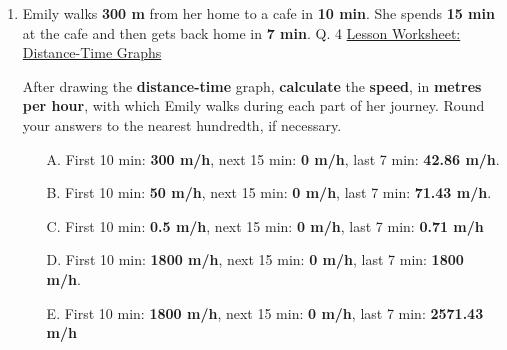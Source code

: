 \documentclass[A4,12pt]{article}
\begin{document}
\begin{enumerate}[label=\bfseries (\arabic*)]











\item Emily walks \textbf{300 m} from her home to a cafe in \textbf{10 min}. She spends \textbf{15 min} at the cafe and then gets back home in \textbf{7 min}. \cite{Nagwa} Q. 4 \href{https://www.nagwa.com/en/worksheets/932192593730/}{Lesson Worksheet: Distance-Time Graphs}

After drawing the \textbf{distance-time} graph, \textbf{calculate} the \textbf{speed}, in \textbf{metres per hour}, with which Emily walks during each part of her journey. Round your answers to the nearest hundredth, if necessary.
%
\begin{itemize}
    \item[A. ] First 10 min: \textbf{300 m/h}, next 15 min: \textbf{0 m/h}, last 7 min: \textbf{42.86 m/h}.
    \item[B. ] First 10 min: \textbf{50 m/h}, next 15 min: \textbf{0 m/h}, last 7 min: \textbf{71.43 m/h}.
    \item[C. ] First 10 min: \textbf{0.5 m/h}, next 15 min: \textbf{0 m/h}, last 7 min: \textbf{0.71 m/h}
    \item[D. ] First 10 min: \textbf{1800 m/h}, next 15 min: \textbf{0 m/h}, last 7 min: \textbf{1800 m/h}.
    \item[E. ] First 10 min: \textbf{1800 m/h}, next 15 min: \textbf{0 m/h}, last 7 min: \textbf{2571.43 m/h}
\end{itemize}
%


\end{enumerate}
\end{document}
